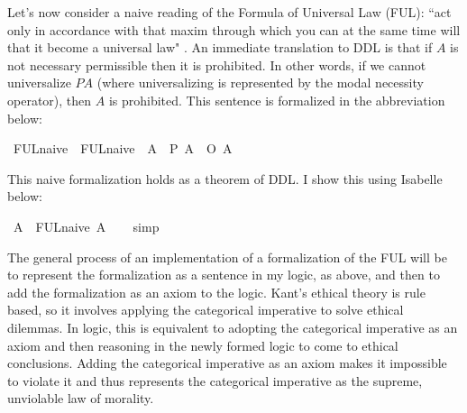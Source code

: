 \begin{isabellebody}
\begin{isamarkuptext}
Let's now consider a naive reading of the Formula of Universal Law (FUL): ``act only in accordance 
with that maxim through which you can at the same time will that it become a universal law" \citep{groundwork}.
An immediate translation to DDL is that if $A$ is not necessary permissible then it is prohibited. In other
words, if we cannot universalize $P A$ (where universalizing is represented by the modal necessity 
operator), then $A$ is prohibited. This sentence is formalized in the abbreviation below:%
\end{isamarkuptext}\isamarkuptrue%
\isamarkupfalse%
\ FUL{\isacharunderscore}naive\ \ {\isachardoublequoteopen}FUL{\isacharunderscore}naive\ {\isasymequiv}\ {\isasymlambda}A{\isachardot}\ {\isacharparenleft}{\isacharparenleft}\isactrlbold {\isasymnot}{\isacharparenleft}{\isasymbox}\ {\isacharparenleft}P\ A{\isacharparenright}{\isacharparenright}{\isacharparenright}\ \isactrlbold {\isasymrightarrow}\ {\isacharparenleft}O\ {\isacharbraceleft}{\isacharparenleft}\isactrlbold {\isasymnot}A{\isacharparenright}{\isacharbraceright}{\isacharparenright}{\isacharparenright}{\isachardoublequoteclose}\isanewline
%
%
\begin{isamarkuptext}%
This naive formalization holds as a theorem of DDL. I show this using Isabelle below:%
\end{isamarkuptext}\isamarkuptrue%
\isamarkupfalse%
\ {\isachardoublequoteopen}{\isasymforall}A{\isachardot}\ {\isasymTurnstile}\ {\isacharparenleft}FUL{\isacharunderscore}naive\ A{\isacharparenright}{\isachardoublequoteclose}\isanewline
%
\isadelimproof
\ \ %
\endisadelimproof
%
\isatagproof
{}\isamarkupfalse%
\ simp\isanewline
%
%
\endisatagproof
{\isafoldproof}%
%
\isadelimproof
%
\endisadelimproof
%
\begin{isamarkuptext}%
The general process of an implementation of a formalization of the FUL will be to represent the 
formalization as a sentence in my logic, as above, and then to add the formalization as an axiom to 
the logic. Kant's ethical theory is rule based, so it involves applying the categorical
imperative to solve ethical dilemmas. In logic, this is equivalent to adopting the categorical imperative as 
an axiom and then reasoning in the newly formed logic to come to ethical conclusions. Adding the categorical
imperative as an axiom makes it impossible to violate it and thus represents the categorical imperative
as the supreme, unviolable law of morality. 


\end{isamarkuptext}
\end{isabellebody}
